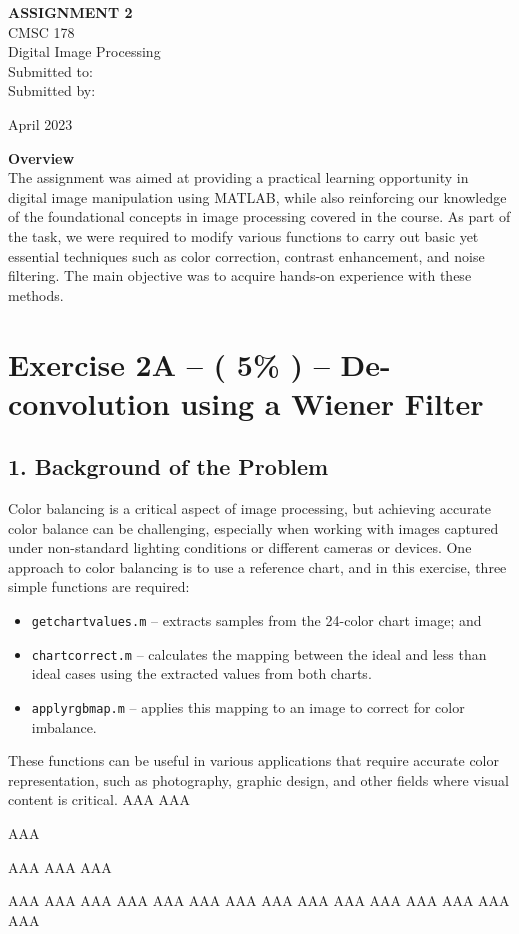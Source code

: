 \documentclass{article}
\newcommand{\mytitlepage}{
    \begin{titlepage}
        \begin{center}
            \vspace*{1.5cm}
            
            \LARGE\textbf{ASSIGNMENT 2}
            \vspace{0.5cm}\\
            \Large CMSC 178\\
            \Large Digital Image Processing\\
            \vspace{3cm}
            Submitted to:\\
            
            \vspace{2.5cm}
            Submitted by:\\
            
            \vspace{4cm}
            
	April 2023
            
            \vspace{1.3cm}
        \end{center}
        \large\textbf{Overview}\\
        The assignment was aimed at providing a practical learning opportunity in digital image manipulation using MATLAB, while also reinforcing our knowledge of the foundational concepts in image processing covered in the course. As part of the task, we were required to modify various functions to carry out basic yet essential techniques such as color correction, contrast enhancement, and noise filtering. The main objective was to acquire hands-on experience with these methods.
    \end{titlepage}
}
\begin{document}
	\mytitlepage

	\newpage
	\section*{Exercise 2A –  ( 5\% ) – De-convolution using a Wiener Filter}
	
	\subsection*{1. Background of the Problem}
	Color balancing is a critical aspect of image processing, but achieving accurate color balance can be challenging, especially when working with images captured under non-standard lighting conditions or different cameras or devices. One approach to color balancing is to use a reference chart, and in this exercise, three simple functions are required:
	\begin{itemize}
	\item {\texttt{get\textunderscore chart\textunderscore values.m}} – extracts samples from the 24-color chart image; and 
	\item {\texttt{chart\textunderscore correct.m}}  – calculates the mapping between the ideal and less than ideal cases using the extracted values from both charts. 
	\item {\texttt{apply\textunderscore rgb\textunderscore map.m}} –  applies this mapping to an image to correct for color imbalance.
	\end{itemize}
 These functions can be useful in various applications that require accurate color representation, such as photography, graphic design, and other fields where visual content is critical.
 AAA
 AAA

 AAA

 AAA
 AAA
 AAA
 
 AAA
 AAA
 AAA
 AAA
 AAA
 AAA
 AAA
 AAA
 AAA
 AAA
 AAA
 AAA
 AAA
 AAA
 AAA
 
\end{document}
